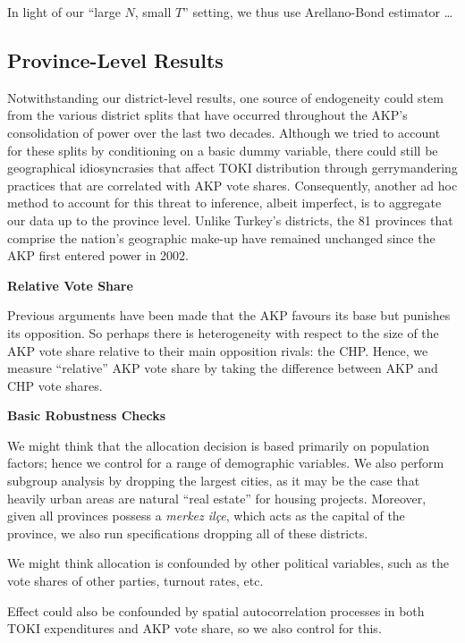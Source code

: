 \documentclass[10pt, oneside]{article}   	%
\numberwithin{equation}{section}
\begin{document}
In light of our ``large $N$, small $T$'' setting, we thus use Arellano-Bond estimator \dots 



\subsection{Province-Level Results}

Notwithstanding our district-level results, one source of endogeneity could stem from the various district splits that have occurred throughout the AKP's consolidation of power over the last two decades. Although we tried to account for these splits by conditioning on a basic dummy variable, there could still be geographical idiosyncrasies that affect TOKI distribution through gerrymandering practices that are correlated with AKP vote shares. Consequently, another ad hoc method to account for this threat to inference, albeit imperfect, is to aggregate our data up to the province level. Unlike Turkey's districts, the 81 provinces that comprise the nation's geographic make-up have remained unchanged since the AKP first entered power in 2002. 



\textbf{Relative Vote Share}

Previous arguments have been made that the AKP favours its base but punishes its opposition. So perhaps there is heterogeneity with respect to the size of the AKP vote share relative to their main opposition rivals: the CHP. Hence, we measure ``relative'' AKP vote share by taking the difference between AKP and CHP vote shares. 

\textbf{Basic Robustness Checks}

We might think that the allocation decision is based primarily on population factors; hence we control for a range of demographic variables. We also perform subgroup analysis by dropping the largest cities, as it may be the case that heavily urban areas are natural ``real estate'' for housing projects. Moreover, given all provinces possess a \textit{merkez ilçe}, which acts as the capital of the province, we also run specifications dropping all of these districts.  

We might think allocation is confounded by other political variables, such as the vote shares of other parties, turnout rates, etc. 

Effect could also be confounded by spatial autocorrelation processes in both TOKI expenditures and AKP vote share, so we also control for this. 
\end{document}
